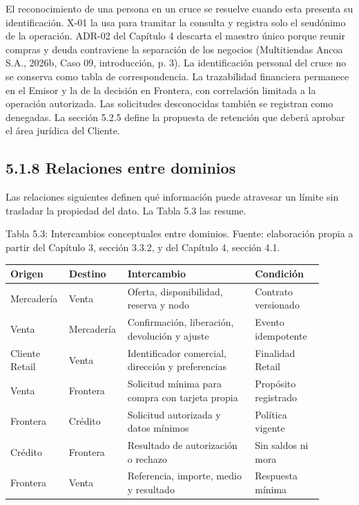 \documentclass[11pt]{article}
\begin{document}
El reconocimiento de una persona en un cruce se resuelve cuando esta presenta su identificación. X-01 la usa para tramitar la consulta y registra solo el seudónimo de la operación. ADR-02 del Capítulo 4 descarta el maestro único porque reunir compras y deuda contraviene la separación de los negocios (Multitiendas Ancoa S.A., 2026b, Caso 09, introducción, p. 3). La identificación personal del cruce no se conserva como tabla de correspondencia. La trazabilidad financiera permanece en el Emisor y la de la decisión en Frontera, con correlación limitada a la operación autorizada. Las solicitudes desconocidas también se registran como denegadas. La sección 5.2.5 define la propuesta de retención que deberá aprobar el área jurídica del Cliente.

\subsection{5.1.8 Relaciones entre dominios}

Las relaciones siguientes definen qué información puede atravesar un límite sin trasladar la propiedad del dato. La Tabla 5.3 las resume.

\par\vspace{0.6\baselineskip}\noindent\begin{minipage}{\linewidth}
Tabla 5.3: Intercambios conceptuales entre dominios. Fuente: elaboración propia a partir del Capítulo 3, sección 3.3.2, y del Capítulo 4, sección 4.1.\label{tab:t_inter}\par\vspace{0.3\baselineskip}
\begin{tabular}{@{}p{0.147\linewidth}p{0.147\linewidth}p{0.391\linewidth}p{0.217\linewidth}@{}}
\toprule Origen & Destino & Intercambio & Condición \\
\midrule
Mercadería & Venta & Oferta, disponibilidad, reserva y nodo & Contrato versionado \\
Venta & Mercadería & Confirmación, liberación, devolución y ajuste & Evento idempotente \\
Cliente Retail & Venta & Identificador comercial, dirección y preferencias & Finalidad Retail \\
Venta & Frontera & Solicitud mínima para compra con tarjeta propia & Propósito registrado \\
Frontera & Crédito & Solicitud autorizada y datos mínimos & Política vigente \\
Crédito & Frontera & Resultado de autorización o rechazo & Sin saldos ni mora \\
Frontera & Venta & Referencia, importe, medio y resultado & Respuesta mínima \\
\bottomrule
\end{tabular}
\end{minipage}
\par
\end{document}

